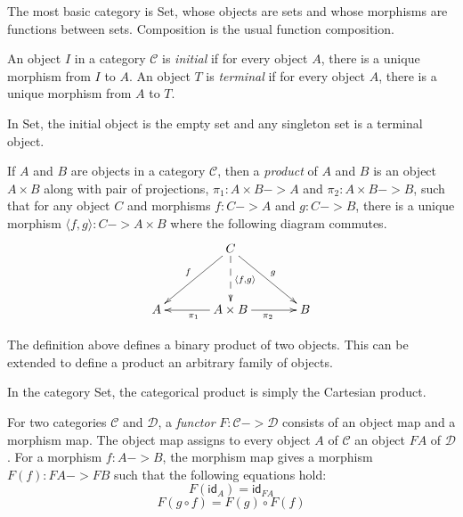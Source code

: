 \begin{example}
The most basic category is \textsf{Set}, whose objects are sets and whose morphisms are functions between sets.  Composition is the usual function composition.
\end{example}

\begin{definition}
An object $I$ in a category $\mathcal{C}$ is \emph{initial} if for every object $A$, there is a unique morphism from $I$ to $A$.  An object $T$ is \emph{terminal} if for every object $A$, there is a unique morphism from $A$ to $T$.
\end{definition}

\begin{example}
In \textsf{Set}, the initial object is the empty set and any singleton set is a terminal object.
\end{example}

\begin{definition}
If $A$ and $B$ are objects in a category $\mathcal{C}$, then a \emph{product} of $A$ and $B$ is an object $A \times B$ along with pair of projections, $\pi_1:A\times B->A$ and $\pi_2:A\times B->B$, such that for any object $C$ and morphisms $f:C->A$ and $g:C->B$, there is a unique morphism $\langle f, g\rangle : C -> A\times B$ where the following diagram commutes.
\[
\xymatrix @+1pc{
& C\ar[dl]_{f}\ar[dr]^{g}\ar@{-->}[d]^{\langle f, g\rangle} \\
A & A\times B\ar[l]^{\pi_1}\ar[r]_{\pi_2} & B
}
\]
\end{definition}

The definition above defines a binary product of two objects.  This can be extended to define a product an arbitrary family of objects.

\begin{example}
In the category \textsf{Set}, the categorical product is simply the Cartesian product.
\end{example}

\begin{definition}
For two categories $\mathcal{C}$ and $\mathcal{D}$, a \emph{functor} $F:\mathcal{C}->\mathcal{D}$ consists of an object map and a morphism map.  The object map assigns to every object $A$ of $\mathcal{C}$ an object $FA$ of $\mathcal{D}$.  For a morphism $f:A->B$, the morphism map gives a morphism $F(f):FA->FB$ such that the following equations hold:
\[F(\textsf{id}_A) = \textsf{id}_{FA}\]
\[F(g\circ f) = F(g) \circ F(f)\]
\end{definition}

